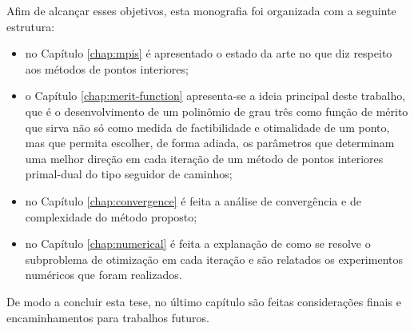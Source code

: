Afim de alcançar  esses objetivos, esta monografia foi organizada com a seguinte estrutura: 

\begin{itemize}
	\item no Capítulo \ref{chap:mpis} é apresentado o estado da arte no
que diz respeito aos métodos de pontos interiores; 
\item o Capítulo \ref{chap:merit-function} apresenta-se a ideia principal deste trabalho, que é o
desenvolvimento de um polinômio de grau três como função de mérito  que sirva não só como medida
de factibilidade e otimalidade de um ponto, mas que permita escolher, de forma
adiada, os parâmetros que determinam uma melhor direção em cada iteração
de um método de pontos interiores primal-dual do tipo seguidor de caminhos; 
\item no Capítulo \ref{chap:convergence} é feita a análise de convergência e de complexidade do método proposto; 
\item no Capítulo \ref{chap:numerical} é feita a explanação de como se resolve o subproblema de otimização em cada iteração e são relatados os experimentos numéricos que foram realizados.


\end{itemize}

 De modo a  concluir esta tese, no último capítulo são feitas considerações finais e encaminhamentos para trabalhos futuros.

